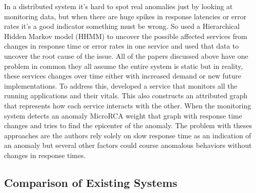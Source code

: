 In a distributed system it's hard to spot real anomalies just by looking at monitoring data, but when there are huge spikes in response latencies or error rates it's a good indicator something must be wrong. So \cite{samir2019dla} used a Hierarchical Hidden Markov model (HHMM) to uncover the possible affected services from changes in response time or error rates in one service and used that data to uncover the root cause of the issue. All of the papers discussed above have one problem in common they all assume the entire system is static but in reality, these services changes over time either with increased demand or new future implementations. To address this, \cite{wu2020microrca} developed a service that monitors all the running applications and their vitals. This also constructs an attributed graph that represents how each service interacts with the other. When the monitoring system detects an anomaly MicroRCA weight that graph with response time changes and tries to find the epicenter of the anomaly. The problem with theses approaches are the authors rely solely on slow response time as an indication of an anomaly but several other factors could course anomalous behaviors without changes in response times.

\subsection{Comparison of Existing Systems}

